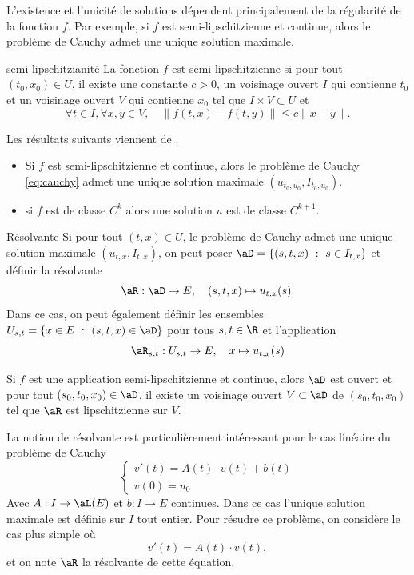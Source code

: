 L'existence et l'unicité de solutions dépendent principalement de la régularité de la fonction $f$. Par exemple,
si $f$ est semi-lipschitzienne et continue, alors le problème de Cauchy admet une unique solution maximale.

\begin{defn}{semi-lipschitzianité}{}
	La fonction $f$ est semi-lipschitzienne si pour tout $(t_0, x_0)\in U$, il existe une constante $c > 0$, un voisinage ouvert $I$ qui contienne $t_0$ et
	un voisinage ouvert $V$ qui contienne $x_0$ tel que $I \times V \subset U$ et
	\[
		\forall t \in I,\forall x,y \in V, \quad \|f(t,x) - f(t,y)\| \le c \|x-y\|.
	\]
\end{defn}

Les résultats suivants viennent de \cite{paulin}.

\begin{thm}{}{}
	\begin{itemize}
		\item Si $f$ est semi-lipschitzienne et continue, alors le problème de Cauchy \ref{eq:cauchy} admet une unique solution maximale $(u_{t_0, u_0}, I_{t_0, u_0})$.
		\item si $f$ est de classe $C^k$ alors une solution $u$ est de classe $C^{k+1}$.
	\end{itemize}
\end{thm}

\begin{defn}{Résolvante}{}
	Si pour tout $(t, x) \in U$, le problème de Cauchy admet une unique solution maximale $(u_{t,x}, I_{t,x})$, on peut poser $\aD = \left\{(s,t,x) \ :\ s \in I_{t,x} \right\}$ et définir la résolvante
	\[
		\aR : \aD \to E, \quad (s,t,x) \mapsto u_{t,x}(s).
	\]
	Dans ce cas, on peut également définir les ensembles $U_{s,t} = \{x \in E \ : \ (s,t,x) \in \aD\}$ pour tous $s,t \in \R$ et l'application
	\[
		\aR_{s,t} : U_{s,t} \to E, \quad x \mapsto u_{t,x}(s)
	\]
\end{defn}

\begin{thm}{}{}
	Si $f$ est une application semi-lipschitzienne et continue, alors $\aD$ est ouvert et pour tout $(s_0, t_0, x_0) \in \aD$, il existe un voisinage ouvert
	$V \subset \aD$ de $(s_0, t_0, x_0)$ tel que $\aR$ est lipschitzienne sur $V$.
\end{thm}

La notion de résolvante est particulièrement intéressant pour le cas linéaire du problème de Cauchy
\begin{equation}
	\begin{cases}
		v'(t) = A(t) \cdot v(t) + b(t) \\
		v(0) = u_0
	\end{cases}
	\label{eq:cauchy_lin}
\end{equation}
Avec $A : I \to \aL(E)$ et $b : I \to E$ continues. Dans ce cas l'unique solution maximale est définie sur $I$ tout entier.
Pour résudre ce problème, on considère le cas plus simple où
\[
	v'(t) = A(t) \cdot v(t),
\]
et on note $\aR$ la résolvante de cette équation.

